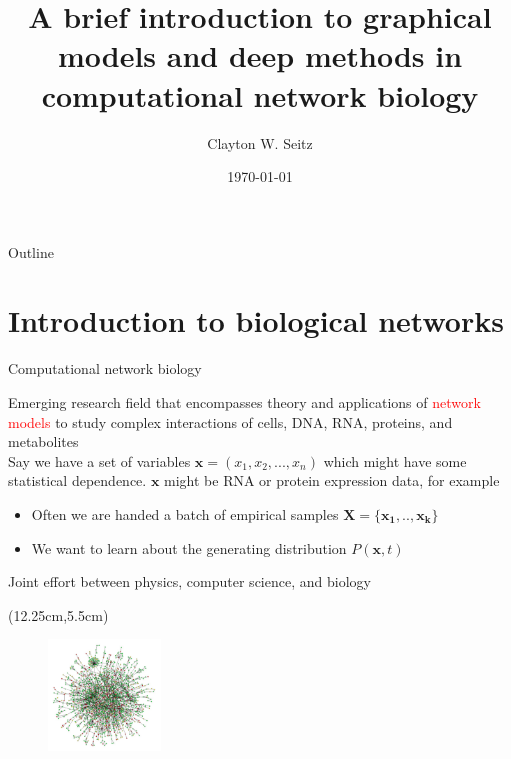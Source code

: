 \documentclass[aspectratio=1610]{beamer}					%
\title{A brief introduction to graphical models and deep methods in computational network biology}	%
\author{Clayton W. Seitz}								%
\date{\today}									%
\begin{document}
\begin{frame}
  \titlepage
\end{frame}

\begin{frame}{Outline}
  \tableofcontents
\end{frame}

%

\section{Introduction to biological networks}

\begin{frame}{Computational network biology}

Emerging research field that encompasses theory and applications of \textcolor{red}{network models} to study complex interactions of cells, DNA, RNA, proteins, and metabolites\\
\vspace{0.2in}
Say we have a set of variables $\bm{x} = (x_{1},x_{2},...,x_{n})$ which might have some statistical dependence. $\bm{x}$ might be RNA or protein expression data, for example\\
\vspace{0.2in}
\begin{itemize}
\item Often we are handed a batch of empirical samples $\bm{X} = \{\bm{x_{1}},..,\bm{x_{k}}\}$
\item We want to learn about the generating distribution $P(\bm{x},t)$
\end{itemize}

\vspace{0.2in}
Joint effort between physics, computer science, and biology

\begin{textblock*}{3cm}(12.25cm,5.5cm)
\begin{figure}
\includegraphics[width=3cm]{net.png}
\end{figure}
\end{textblock*}

\end{frame}
\end{document}

